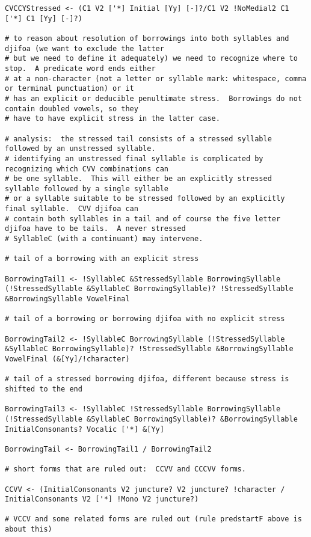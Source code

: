 \documentclass{article}
\begin{document}
\begin{verbatim}
CVCCYStressed <- (C1 V2 ['*] Initial [Yy] [-]?/C1 V2 !NoMedial2 C1 ['*] C1 [Yy] [-]?)

# to reason about resolution of borrowings into both syllables and djifoa (we want to exclude the latter
# but we need to define it adequately) we need to recognize where to stop.  A predicate word ends either
# at a non-character (not a letter or syllable mark: whitespace, comma or terminal punctuation) or it
# has an explicit or deducible penultimate stress.  Borrowings do not contain doubled vowels, so they
# have to have explicit stress in the latter case.

# analysis:  the stressed tail consists of a stressed syllable followed by an unstressed syllable.
# identifying an unstressed final syllable is complicated by recognizing which CVV combinations can
# be one syllable.  This will either be an explicitly stressed syllable followed by a single syllable
# or a syllable suitable to be stressed followed by an explicitly final syllable.  CVV djifoa can
# contain both syllables in a tail and of course the five letter djifoa have to be tails.  A never stressed
# SyllableC (with a continuant) may intervene.

# tail of a borrowing with an explicit stress

BorrowingTail1 <- !SyllableC &StressedSyllable BorrowingSyllable (!StressedSyllable &SyllableC BorrowingSyllable)? !StressedSyllable &BorrowingSyllable VowelFinal

# tail of a borrowing or borrowing djifoa with no explicit stress

BorrowingTail2 <- !SyllableC BorrowingSyllable (!StressedSyllable &SyllableC BorrowingSyllable)? !StressedSyllable &BorrowingSyllable VowelFinal (&[Yy]/!character)

# tail of a stressed borrowing djifoa, different because stress is shifted to the end

BorrowingTail3 <- !SyllableC !StressedSyllable BorrowingSyllable (!StressedSyllable &SyllableC BorrowingSyllable)? &BorrowingSyllable InitialConsonants? Vocalic ['*] &[Yy]

BorrowingTail <- BorrowingTail1 / BorrowingTail2

# short forms that are ruled out:  CCVV and CCCVV forms.

CCVV <- (InitialConsonants V2 juncture? V2 juncture? !character / InitialConsonants V2 ['*] !Mono V2 juncture?)

# VCCV and some related forms are ruled out (rule predstartF above is about this)


\end{verbatim}
\end{document}
